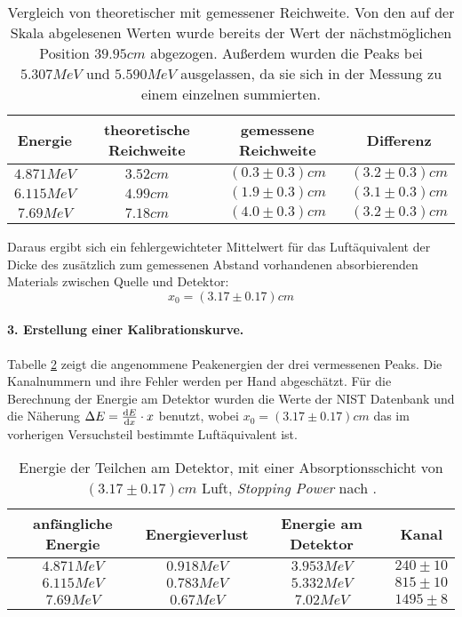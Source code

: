 \documentclass{../Misc/MontavonLaTeX/Montavon}
\begin{document}
\begin{table}[htbp]
\centering
\begin{tabular}{|c|c|c|c|}
\hline
Energie & theoretische Reichweite & gemessene Reichweite & Differenz \\
\hline
$4.871 \unit{MeV}$ & $3.52 \unit{cm}$ & $(0.3 \pm 0.3) \unit{cm}$ & $(3.2 \pm 0.3) \unit{cm} $ \\
$6.115 \unit{MeV}$ & $4.99 \unit{cm}$ & $(1.9 \pm 0.3) \unit{cm}$ & $(3.1 \pm 0.3) \unit{cm} $ \\
$7.69 \unit{MeV}$ & $7.18 \unit{cm}$ & $(4.0 \pm 0.3) \unit{cm}$ & $(3.2 \pm 0.3) \unit{cm} $ \\
\hline 
\end{tabular}
\caption{Vergleich von theoretischer mit gemessener Reichweite. Von den auf der Skala abgelesenen Werten wurde bereits der Wert der nächstmöglichen Position $39.95 \unit{cm}$ abgezogen. Außerdem wurden die Peaks bei $5.307 \unit{MeV}$ und $5.590 \unit{MeV}$ ausgelassen, da sie sich in der Messung zu einem einzelnen summierten.}
\label{tbl:radium_distanz_vergleich}
\end{table}

Daraus ergibt sich ein fehlergewichteter Mittelwert für das Luftäquivalent der Dicke des zusätzlich zum gemessenen Abstand vorhandenen absorbierenden Materials zwischen Quelle und Detektor:
\[
	x_0 = (3.17 \pm 0.17) \unit{cm}
\]


\paragraph{3. Erstellung einer Kalibrationskurve.}
Tabelle \ref{tbl:radium_kalibration} zeigt die angenommene Peakenergien der drei vermessenen Peaks. Die Kanalnummern und ihre Fehler werden per Hand abgeschätzt. Für die Berechnung der Energie am Detektor wurden die Werte der NIST Datenbank \cite{nist_alpha} und die Näherung $\Delta E = \frac{\mathrm d E}{\mathrm d x} \cdot x$ benutzt, wobei $x_0 = (3.17 \pm 0.17) \unit{cm}$ das im vorherigen Versuchsteil bestimmte Luftäquivalent ist.

\begin{table}[htbp]
\centering
\begin{tabular}{|c|c|c||c|}
\hline
anfängliche Energie & Energieverlust & Energie am Detektor & Kanal \\
\hline 
$4.871 \unit{MeV}$ & $0.918 \unit{MeV}$ & $3.953 \unit{MeV}$ & $240 \pm 10$ \\
$6.115 \unit{MeV}$ & $0.783 \unit{MeV}$ & $5.332 \unit{MeV}$ & $815 \pm 10$ \\
$7.69 \unit{MeV}$ & $0.67 \unit{MeV}$ & $7.02 \unit{MeV}$ & $1495 \pm 8$ \\
\hline
\end{tabular}
\caption{Energie der Teilchen am Detektor, mit einer Absorptionsschicht von $(3.17 \pm 0.17) \unit{cm}$ Luft, \emph{Stopping Power} nach \cite{nist_alpha}.}
\label{tbl:radium_kalibration}
\end{table}
\end{document}
